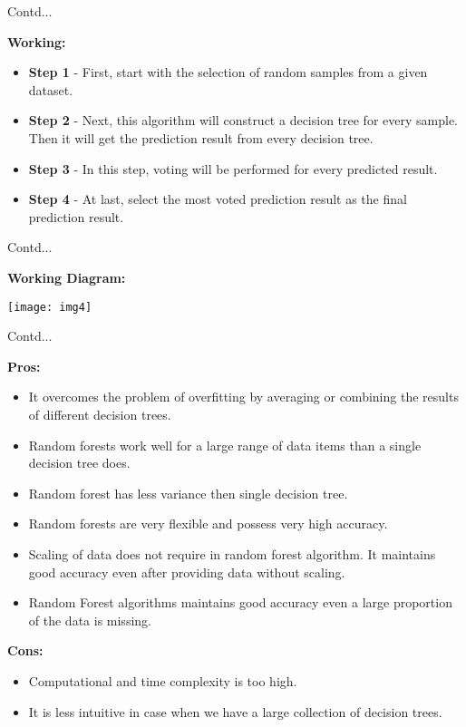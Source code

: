 \documentclass{beamer}
\newcommand\myheading[1]{%
  \par\bigskip
  {\large\bfseries#1}\par\smallskip}
\begin{document}
\begin{frame}{Contd...}
	\begin{flushleft}
		\myheading{Working:}
		\begin{itemize}
			\item \textbf{Step 1} - First, start with the selection of random samples from a given dataset.
			\item \textbf{Step 2} - Next, this algorithm will construct a decision tree for every sample. Then it will get the prediction result from every decision tree.
			\item \textbf{Step 3} - In this step, voting will be performed for every predicted result.
			\item \textbf{Step 4} - At last, select the most voted prediction result as the final prediction result.
		\end{itemize}
	\end{flushleft}
\end{frame}

\begin{frame}{Contd...}
	\begin{flushleft}
		\myheading{Working Diagram:}
	\end{flushleft}
		\texttt{[image: img4]}
\end{frame}

\begin{frame}{Contd...}
	\begin{flushleft}
	\myheading{Pros:}
	\begin{itemize}
		\item It overcomes the problem of overfitting by averaging or combining the results of different decision trees.
		\item Random forests work well for a large range of data items than a single decision tree does.
		\item Random forest has less variance then single decision tree.
		\item Random forests are very flexible and possess very high accuracy.
		\item Scaling of data does not require in random forest algorithm. It maintains good accuracy even after providing data without scaling.
		\item Random Forest algorithms maintains good accuracy even a large proportion of the data is missing.
	\end{itemize}
	\myheading{Cons:}
	\begin{itemize}
		\item Computational and time complexity is too high.
		\item It is less intuitive in case when we have a large collection of decision trees.
	\end{itemize}
	\end{flushleft}
\end{frame}
\end{document}
